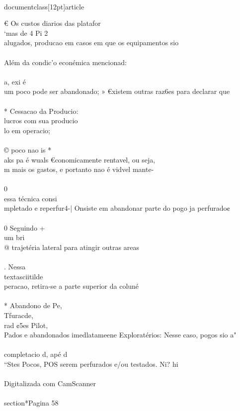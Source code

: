 \\documentclass[12pt]{article}
\begin{document}
€ Os custos diarios das platafor\\
‘mas de 4 Pi 2\\
alugados, producao em casos em que os equipamentos sio\\
\\
Além da condic’o econémica mencionad:\\
\\
a, exi é\\
um poco pode ser abandonado; » €xistem outras raz6es para declarar que\\
\\
* Cessacao da Producio:\\
lucros com sua producio\\
lo em operacio;\\
\\
© poco nao is *\\
aks pa é wuals €conomicamente rentavel, ou seja, \\%
m mais os gastos, e portanto nao é vidvel mante-\\
\\
0\\
essa técnica consi\\
mpletado e reperfur4-| Onsiste em abandonar parte do pogo ja perfurado¢\\
\\
0 Seguindo +\\
um bri\\
@ trajetéria lateral para atingir outras areas\\
\\
. Nessa \\textasciitilde{}\\
peracao, retira-se a parte superior da coluné\\
\\
* Abandono de Pe,\\
Tfuracde,\\
rad ¢5es Pilot,\\
Pados e abandonados imedlatameene Exploratérios: Nesse caso, pogos sio a"\\
\\
completacio d, apé d\\
“Stes Pocos, POS serem perfurados e/ou testados. Ni? hi\\
\\
Digitalizada com CamScanner\\

\\section*{Pagina 58}
\end{document}
